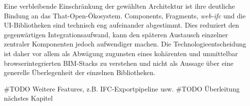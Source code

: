 Eine verbleibende Einschränkung der gewählten Architektur ist ihre deutliche Bindung an das
That-Open-Ökosystem. Components, Fragments, \textit{web-ifc} und die UI-Bibliotheken sind technisch
eng aufeinander abgestimmt. Dies reduziert den gegenwärtigen Integrationsaufwand, kann den späteren
Austausch einzelner zentraler Komponenten jedoch aufwendiger machen. Die Technologieentscheidung ist
daher vor allem als Abwägung zugunsten eines kohärenten und unmittelbar browserintegrierten
BIM-Stacks zu verstehen und nicht als Aussage über eine generelle Überlegenheit der einzelnen
Bibliotheken.

\#TODO Weitere Features, z.B. IFC-Exportpipeline usw.
\#TODO Überleitung nächstes Kapitel
